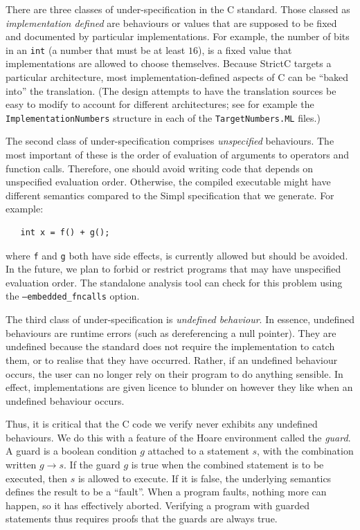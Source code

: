 \documentclass{article}
\newcommand{\strictc}{\textsf{StrictC}}
\newcommand{\MLsuffix}{.ML}
\newcommand{\srcfile}[1]{\texttt{#1}}
\newcommand{\MLfile}[1]{\srcfile{#1\MLsuffix}}
\begin{document}
There are three classes of under-specification in the C standard.
Those classed as \emph{implementation defined} are behaviours or
values that are supposed to be fixed and documented by particular
implementations.  For example, the number of bits in an \texttt{int}
(a number that must be at least $16$), is a fixed value that implementations
are allowed to choose themselves.  Because \strictc{} targets a
particular architecture, most implementation-defined aspects of C can
be ``baked into'' the translation.  (The design attempts to have the
translation sources be easy to modify to account for different
architectures; see for example the \texttt{ImplementationNumbers}
structure in each of the \MLfile{TargetNumbers} files.)

The second class of under-specification comprises \emph{unspecified}
behaviours.  The most important of these is the order of evaluation of
arguments to operators and function calls.
Therefore, one should avoid writing code that depends on unspecified
evaluation order. Otherwise, the compiled executable might have
different semantics compared to the Simpl specification that we
generate. For example:
\begin{verbatim}
   int x = f() + g();
\end{verbatim}
where \texttt{f} and \texttt{g} both have side effects, is currently
allowed but should be avoided. In the future, we plan to forbid or
restrict programs that may have unspecified evaluation order.
The standalone analysis tool can check for this problem using the
\texttt{--embedded\_fncalls} option.

The third class of under-specification is \emph{undefined behaviour}.
In essence, undefined behaviours are runtime errors (such as
dereferencing a null pointer).  They are undefined because the
standard does not require the implementation to catch them, or to
realise that they have occurred.  Rather, if an undefined behaviour
occurs, the user can no longer rely on their program to do anything
sensible.  In effect, implementations are given licence to blunder on
however they like when an undefined behaviour occurs.

Thus, it is critical that the C code we verify never exhibits any
undefined behaviours.  We do this with a feature of the Hoare
environment called the \emph{guard}.  A guard is a boolean condition
$g$ attached to a statement $s$, with the combination written $g\to
s$.  If the guard $g$ is true when the combined statement is to be
executed, then $s$ is allowed to execute.  If it is false, the
underlying semantics defines the result to be a ``fault''.  When a
program faults, nothing more can happen, so it has effectively
aborted.  Verifying a program with guarded statements thus requires
proofs that the guards are always true.
\end{document}

